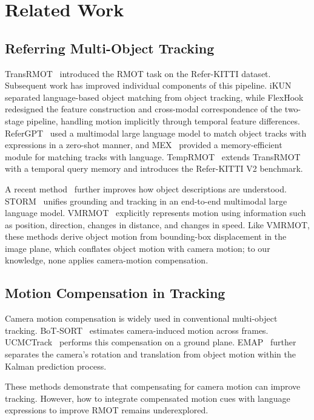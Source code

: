 \documentclass{article}
\begin{document}
\section{Related Work}
\label{sec:related}
\subsection{Referring Multi-Object Tracking}
TransRMOT~\cite{transrmot} introduced the RMOT task on the Refer-KITTI dataset. Subsequent work has improved individual components of this pipeline. iKUN~\cite{ikun} separated language-based object matching from object tracking, while FlexHook~\cite{flexhook} redesigned the feature construction and cross-modal correspondence of the two-stage pipeline, handling motion implicitly through temporal feature differences. ReferGPT~\cite{refergpt} used a multimodal large language model to match object tracks with expressions in a zero-shot manner, and MEX~\cite{mex} provided a memory-efficient module for matching tracks with language. TempRMOT~\cite{temprmot} extends TransRMOT with a temporal query memory and introduces the Refer-KITTI V2 benchmark.

A recent method~\cite{deeprmot} further improves how object descriptions are understood. STORM~\cite{storm} unifies grounding and tracking in an end-to-end multimodal large language model. VMRMOT~\cite{vmrmot} explicitly represents motion using information such as position, direction, changes in distance, and changes in speed. Like VMRMOT, these methods derive object motion from bounding-box displacement in the image plane, which conflates object motion with camera motion; to our knowledge, none applies camera-motion compensation.

\subsection{Motion Compensation in Tracking}
Camera motion compensation is widely used in conventional multi-object tracking. BoT-SORT~\cite{botsort} estimates camera-induced motion across frames. UCMCTrack~\cite{ucmctrack} performs this compensation on a ground plane. EMAP~\cite{emap} further separates the camera's rotation and translation from object motion within the Kalman prediction process.

These methods demonstrate that compensating for camera motion can improve tracking. However, how to integrate compensated motion cues with language expressions to improve RMOT remains underexplored.
\end{document}
